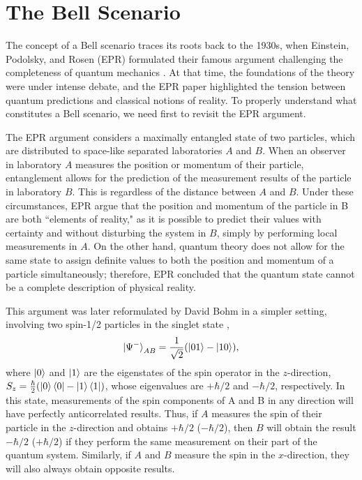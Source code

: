 \documentclass[aps,pra,reprint, superscriptaddress,showkeys]{revtex4-2}
\theoremstyle{plain}
\begin{document}
\section{The Bell Scenario}
\label{sec:The Bell scenario}

The concept of a Bell scenario traces its roots back to the 1930s, when Einstein, Podolsky, and Rosen (EPR) formulated their famous argument challenging the completeness of quantum mechanics \cite{einstein1935can}. At that time, the foundations of the theory were under intense debate, and the EPR paper highlighted the tension between quantum predictions and classical notions of reality. To properly understand what constitutes a Bell scenario, we need first to revisit the EPR argument.

The EPR argument considers a maximally entangled state of two particles, which are distributed to  space-like separated laboratories $A$ and $B$. When an observer in laboratory $A$ measures the position or momentum of their particle, entanglement allows for the prediction of the measurement results of the particle in laboratory $B$. This is regardless of the distance between $A$ and $B$. Under these circumstances, EPR argue that the position and momentum of the particle in B are both ``elements of reality," as it is possible to predict their values with certainty and without disturbing the system in $B$, simply by performing local measurements in $A$. On the other hand, quantum theory does not allow for the same state to assign definite values to both the position and momentum of a particle simultaneously; therefore, EPR concluded that the quantum state cannot be a complete description of physical reality.

This argument was later reformulated by David Bohm in a simpler setting, involving two spin-1/2 particles in the singlet state \cite{bohm1951quantum},
\begin{equation}\label{bellstates}
    \ket{\Psi^-}_{AB} = \frac{1}{\sqrt{2}}(\ket{01}-\ket{10}),
\end{equation}
where $\ket{0}$ and $\ket{1}$ are the eigenstates of the spin operator in the $z$-direction, $S_z = \frac{\hbar}{2}(\ket{0}\bra{0}-\ket{1}\bra{1})$, whose eigenvalues are $+\hbar/2$ and $-\hbar/2$, respectively. In this state, measurements of the spin components of A and B in any direction will have perfectly anticorrelated results. Thus, if $A$ measures the spin of their particle in the \(z\)-direction and obtains $+\hbar/2$ ($-\hbar/2$), then $B$ will obtain the result $-\hbar/2$ ($+\hbar/2$) if they perform the same measurement on their part of the quantum system. Similarly, if $A$ and $B$ measure the spin in the \(x\)-direction, they will also always obtain opposite results. 
\end{document}
